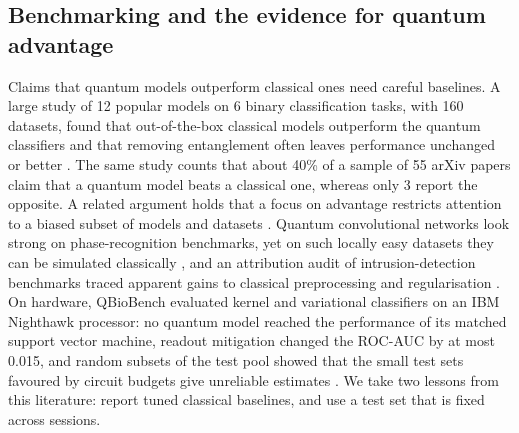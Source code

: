 \subsection{Benchmarking and the evidence for quantum advantage}
Claims that quantum models outperform classical ones need careful baselines. A large study of
12 popular models on 6 binary classification tasks, with 160 datasets, found that
out-of-the-box classical models outperform the quantum classifiers and that removing
entanglement often leaves performance unchanged or better \cite{bowles2024benchmarking}. The
same study counts that about 40\% of a sample of 55 arXiv papers claim that a quantum model
beats a classical one, whereas only 3 report the opposite. A related argument holds that a focus
on advantage restricts attention to a biased subset of models and datasets
\cite{schuld2022advantage}. Quantum convolutional networks look strong on phase-recognition
benchmarks, yet on such locally easy datasets they can be simulated classically
\cite{bermejo2026qcnn}, and an attribution audit of intrusion-detection benchmarks traced
apparent gains to classical preprocessing and regularisation \cite{gillani2026nids}. On
hardware, QBioBench evaluated kernel and variational classifiers on an IBM Nighthawk processor:
no quantum model reached the performance of its matched support vector machine, readout
mitigation changed the ROC-AUC by at most 0.015, and random subsets of the test pool showed
that the small test sets favoured by circuit budgets give unreliable estimates
\cite{qbiobench2026}. We take two lessons from this literature: report tuned classical
baselines, and use a test set that is fixed across sessions.

